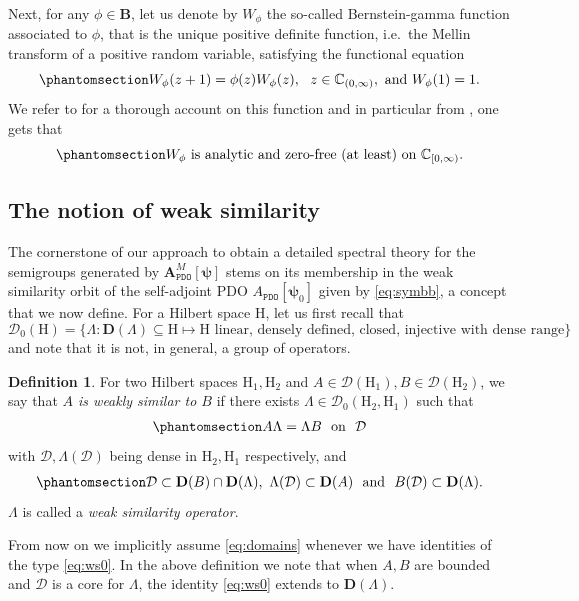 \documentclass[12pt]{amsart}
\newcommand{\hlabel}{\phantomsection\label}
\numberwithin{equation}{section}
\newcommand{\bb}{\mathbb}
\newcommand{\cc}{\mathcal}
\newcommand{\tred}{}
\newcommand{\ttt}{\mathtt}
\newcommand{\AM}{\bm{A}^M}
\newcommand{\B}{\mathbf{B}}
\newcommand{\D}{\mathbf{D}}
\newcommand{\LL}{\Lambda}
\newcommand{\cD}{\mathcal{D}}
\newcommand{\rH}{\mathrm{H}}
\theoremstyle{definition}
\newtheorem{definition}[thm]{Definition}
\theoremstyle{assump}
\theoremstyle{remark}
\begin{document}
 Next, for any $\phi\in\B$, let us denote by $W_{\phi}$ the so-called Bernstein-gamma function associated to $\phi$, that is the  unique positive definite function, i.e.~the Mellin transform of a positive random variable, satisfying the functional equation
\begin{equation} \hlabel{eq:BG_receq}
W_{\phi}(z+1)=\phi(z)W_\phi(z), \ \  z\in\bb{C}_{(0,\infty)}, \textrm{ and } W_\phi(1)=1.
\end{equation}
We refer to \cite{patie2018} for a thorough account on this function and in particular from
\cite[Sec.~4]{patie2018}, one gets that
\begin{equation}\hlabel{eq:W_Zerofree}
W_{\phi} \mbox{ is analytic  and zero-free (at least) on }  \bb{C}_{[0,\infty)}.
\end{equation}


\subsection{The notion of weak similarity} \hlabel{sec:ws}
The cornerstone of our  approach to  obtain a detailed spectral theory for the semigroups generated by $\AM_\ttt{PDO}[\bm{\psi}]$ stems on its membership in the  weak similarity orbit of the self-adjoint PDO $A_\ttt{PDO}[\bm\psi_0]$ given by \eqref{eq:symbb}, a concept that we now define. For a Hilbert space $\rH$, let us first recall that
 \[\mathscr{D}_0(\rH)=\{\Lambda: \D(\Lambda)\subseteq \rH \mapsto  \rH \textrm{ linear, densely defined, closed, injective with dense range} \}\]
 and note that it is not, in general, a group of operators. %
 \begin{definition}
For two Hilbert spaces $\rH_1,\rH_2$ and $A\in\mathscr{D}(\rH_1), B\in\mathscr{D}(\rH_2)$, we say that \emph{$A$ is weakly similar to $B$} if there exists $\Lambda \in \mathscr{D}_0(\rH_2,\rH_1)$ such that
\begin{align}\hlabel{eq:ws0}
	A\Lambda =\Lambda B  \ \mbox{ on } \ \cD
\end{align}
with $\cc{D},\LL(\cD)$ being dense in $\rH_2, \rH_1$ respectively, and
\begin{align}\hlabel{eq:domains}
	\cD\subset\D(B)\cap \D(\LL), \ \LL(\cD)\subset\D(A) \ \text{ and } \ B(\cD)\subset\D(\LL).
\end{align}
$\Lambda$ is called a \emph{weak similarity operator}.
\end{definition}
From now on we implicitly assume \eqref{eq:domains} whenever we have identities of the type \eqref{eq:ws0}. In the above definition we note that when $A,B$ are bounded and $\cD$ is a core for $\LL$, the identity \eqref{eq:ws0} extends to $\D(\Lambda)$.
\end{document}

